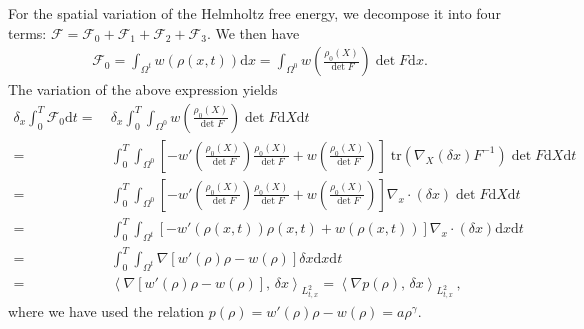 \documentclass[reqno,11pt]{amsart}
\numberwithin{equation}{section}
\def\d{\mathrm{d}}
\def\no{\nonumber}
\def\tr{\mathrm{tr}}
\newcommand{\skpa}[2]{\left\langle #1,\, #2 \right\rangle}
\begin{document}
For the spatial variation of the Helmholtz free energy, we decompose it into four terms: $\mathcal{F} = \mathcal{F}_0 + \mathcal{F}_1 + \mathcal{F}_2 + \mathcal{F}_3$. We then have
\begin{align}
\mathcal{F}_0 = \int_{\Omega^t} w(\rho(x,t)) \d x 
= \int_{\Omega^0} w \left( \frac{\rho_0(X )}{\det F} \right) \det F \d x.
\end{align}
The variation of the above expression yields
  \begin{align}\label{eq:F0-vari-x}
    \no \delta_x \int_0^T \mathcal{F}_0 \d t 
    =\ & \delta_x \int_0^T \int_{\Omega^0} w \left( \frac{\rho_0(X )}{\det F} \right)  \det F \d X \d t \\\no
    =\ & \int_0^T \int_{\Omega^0} \left[ -w'(\tfrac{\rho_0(X )}{\det F}) \frac{\rho_0(X )}{\det F} + w(\tfrac{\rho_0(X )}{\det F}) \right] \;\tr(\nabla_X (\delta x) F^{-1}) \det F \d X \d t 
    \\
    =\ & \int_0^T \int_{\Omega^0} \left[ -w'(\tfrac{\rho_0(X )}{\det F}) \frac{\rho_0(X )}{\det F} + w(\tfrac{\rho_0(X )}{\det F}) \right] \nabla_x \cdot (\delta x) \det F \d X \d t 
    \\\no
    =\ & \int_0^T \int_{\Omega^t} \left[ -w'(\rho(x,t)) \rho(x,t) + w(\rho(x,t)) \right] \nabla_x \cdot (\delta x) \d x \d t 
    \\\no
    =\ & \int_0^T \int_{\Omega^t} \nabla \left[ w'(\rho) \rho - w(\rho) \right] \delta x \d x \d t \\\no
    =\ & \skpa{\nabla \left[ w'(\rho) \rho - w(\rho) \right] }{\delta x}_{L^2_{t,x}} 
    = \skpa{\nabla p(\rho) }{\delta x}_{L^2_{t,x}}\,, 
  \end{align}
where we have used the relation $p(\rho) = w'(\rho) \rho - w(\rho) = a \rho^\gamma $. 
\end{document}
